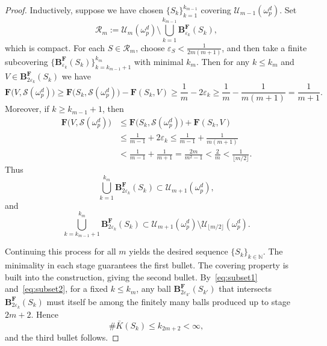 \documentclass[12pt,english]{article}
\theoremstyle{definition}
\begin{document}
\begin{proof}
Inductively, suppose we have chosen \(\{S_k\}_{k=1}^{k_{m-1}}\) covering \(\mathcal{U}_{m-1}(\omega^d_p)\). Set
\[
    \mathcal R_m := \mathcal{U}_m(\omega^d_p)\setminus\bigcup_{k=1}^{k_{m-1}}\mathbf B^\mathbf F_{\varepsilon_k}(S_k),
\]
which is compact. For each \(S\in\mathcal R_m \), choose \(\varepsilon_S<\tfrac{1}{2m(m+1)}\), and then take a finite subcovering \(\{\mathbf B^\mathbf F_{\varepsilon_k}(S_k)\}_{k=k_{m-1}+1}^{k_m}\) with minimal \(k_m\). Then for any \(k\le k_m\) and \(V\in\mathbf B^\mathbf F_{2\varepsilon_k}(S_k)\) we have
\[
    \mathbf{F}\bigl(V, \mathcal{S}(\omega^d_p)\bigr) \geq \mathbf{F}\bigl(S_k, \mathcal{S}(\omega^d_p)\bigr) - \mathbf{F}(S_k, V) \geq \frac{1}{m} - 2\varepsilon_k \geq \frac{1}{m} - \frac{1}{m(m+1)} = \frac{1}{m+1}.
\]
Moreover, if \(k\ge k_{m-1}+1\), then
\begin{align*}
    \mathbf{F}\bigl(V, \mathcal{S}(\omega^d_p)\bigr) &\leq \mathbf{F}\bigl(S_k, \mathcal{S}(\omega^d_p)\bigr) + \mathbf{F}(S_k, V) \\
    &\leq \frac{1}{m-1} + 2\varepsilon_k \leq \frac{1}{m-1} + \frac{1}{m(m+1)} \\
    &< \frac{1}{m-1} + \frac{1}{m+1} = \frac{2m}{m^2 - 1} < \frac{2}{m} < \frac{1}{\lfloor m/2\rfloor}.
\end{align*}
Thus
\begin{equation}\label{eq:subset1}
    \bigcup_{k=1}^{k_m}\mathbf B^\mathbf F_{2\varepsilon_k}(S_k) \subset \mathcal{U}_{m+1}(\omega^d_p),
\end{equation}
and
\begin{equation}\label{eq:subset2}
    \bigcup_{k=k_{m-1}+1}^{k_m}\mathbf B^\mathbf F_{2\varepsilon_k}(S_k)
    \subset \mathcal{U}_{m+1}(\omega^d_p)\setminus\mathcal{U}_{\lfloor m/2\rfloor}(\omega^d_p).
\end{equation}

Continuing this process for all \(m\) yields the desired sequence \(\{S_k\}_{k\in\mathbb N}\). The minimality in each stage guarantees the first bullet. The covering property is built into the construction, giving the second bullet. By~\eqref{eq:subset1} and~\eqref{eq:subset2}, for a fixed \(k\le k_m\), any ball \(\mathbf B^\mathbf F_{2\varepsilon_{k'}}(S_{k'})\) that intersects \(\mathbf B^\mathbf F_{2\varepsilon_k}(S_k)\) must itself be among the finitely many balls produced up to stage \(2m+2\). Hence
\[
    \#\bar K(S_k)\le k_{2m+2}<\infty,
\]
and the third bullet follows.



\end{proof}
\end{document}
